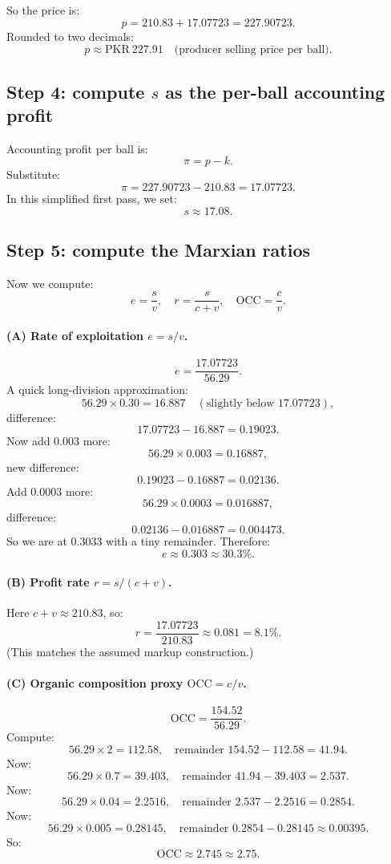 \documentclass[11pt]{article}
\newcommand{\PKR}{\text{PKR}}
\newcommand{\cconst}{c} %
\newcommand{\vvar}{v}   %
\newcommand{\splus}{s}  %
\newcommand{\kcost}{k}  %
\newcommand{\eRate}{e}  %
\newcommand{\pRate}{r}  %
\newcommand{\OCC}{\mathrm{OCC}} %
\begin{document}
So the price is:
\[
  p = 210.83 + 17.07723 = 227.90723.
\]
Rounded to two decimals:
\[
  p \approx \PKR{}~227.91 \quad \text{(producer selling price per ball).}
\]

\subsection{Step 4: compute \(\splus\) as the per-ball accounting profit}
Accounting profit per ball is:
\[
  \pi = p - \kcost.
\]
Substitute:
\[
  \pi = 227.90723 - 210.83 = 17.07723.
\]
In this simplified first pass, we set:
\[
  \splus \approx 17.08.
\]

\subsection{Step 5: compute the Marxian ratios}
Now we compute:
\[
  \eRate=\frac{\splus}{\vvar},\quad
  \pRate=\frac{\splus}{\cconst+\vvar},\quad
  \OCC=\frac{\cconst}{\vvar}.
\]

\paragraph{(A) Rate of exploitation \(\eRate=\splus/\vvar\).}
\[
  \eRate = \frac{17.07723}{56.29}.
\]
A quick long-division approximation:
\[
  56.29\times 0.30 = 16.887 \quad (\text{slightly below }17.07723),
\]
difference:
\[
  17.07723 - 16.887 = 0.19023.
\]
Now add \(0.003\) more:
\[
  56.29\times 0.003 = 0.16887,
\]
new difference:
\[
  0.19023 - 0.16887 = 0.02136.
\]
Add \(0.0003\) more:
\[
  56.29\times 0.0003 = 0.016887,
\]
difference:
\[
  0.02136 - 0.016887 = 0.004473.
\]
So we are at \(0.3033\) with a tiny remainder. Therefore:
\[
  \eRate \approx 0.303 \approx 30.3\%.
\]

\paragraph{(B) Profit rate \(\pRate=\splus/(\cconst+\vvar)\).}
Here \(\cconst+\vvar \approx 210.83\), so:
\[
  \pRate = \frac{17.07723}{210.83} \approx 0.081 = 8.1\%.
\]
(This matches the assumed markup construction.)

\paragraph{(C) Organic composition proxy \(\OCC=\cconst/\vvar\).}
\[
  \OCC = \frac{154.52}{56.29}.
\]
Compute:
\[
  56.29\times 2 = 112.58,\quad \text{remainder } 154.52-112.58=41.94.
\]
Now:
\[
  56.29\times 0.7 = 39.403,\quad \text{remainder } 41.94-39.403=2.537.
\]
Now:
\[
  56.29\times 0.04 = 2.2516,\quad \text{remainder } 2.537-2.2516=0.2854.
\]
Now:
\[
  56.29\times 0.005 = 0.28145,\quad \text{remainder } 0.2854-0.28145\approx 0.00395.
\]
So:
\[
  \OCC \approx 2.745 \approx 2.75.
\]
\end{document}
